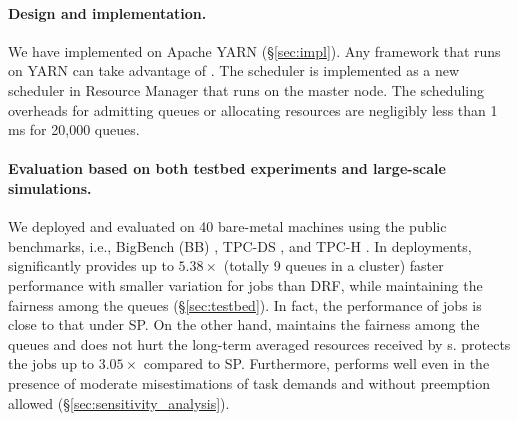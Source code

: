 \paragraph{Design and implementation.} We have implemented \name on Apache YARN \cite{yarn} (\S\ref{sec:impl}).
Any framework that runs on YARN can take advantage of \name.
The \name scheduler is implemented as a new scheduler in Resource Manager that runs on the master node.
The scheduling overheads for admitting queues or allocating resources are negligibly less than 1 ms for 20,000 queues.

\paragraph{Evaluation based on both testbed experiments and large-scale simulations.}
We deployed and evaluated \name on 40 bare-metal machines using the public benchmarks, i.e., BigBench (BB) \cite{bbench}, TPC-DS \cite{tpc-ds}, and TPC-H \cite{tpc-h}.
In deployments, \name significantly provides up to $5.38\times$ (totally 9 queues in a cluster) faster performance with smaller variation for \burstq jobs than DRF, while maintaining the fairness among the queues (\S\ref{sec:testbed}). 
In fact, the performance of \burstq jobs is close to that under SP. 
On the other hand, \name maintains the fairness among the queues and does not hurt the long-term averaged resources received by {\batchq}s.
\name protects the {\batchq} jobs up to $3.05\times$ compared to SP.
Furthermore, \name performs well even in the presence of moderate misestimations of task demands and without preemption allowed (\S\ref{sec:sensitivity_analysis}).


